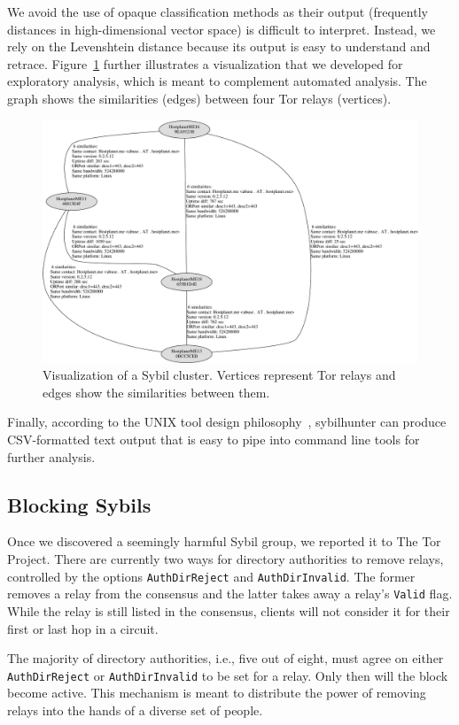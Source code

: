 We avoid the use of opaque classification methods as their output (frequently
distances in high-dimensional vector space) is difficult to interpret.  Instead,
we rely on the Levenshtein distance because its output is easy to understand and
retrace.  Figure~\ref{fig:visualization} further illustrates a visualization
that we developed for exploratory analysis, which is meant to complement
automated analysis.  The graph shows the similarities (edges) between four Tor
relays (vertices).

\begin{figure}[t]
	\centering
	\includegraphics[width=\linewidth]{diagrams/visualization.pdf}
    \caption{Visualization of a Sybil cluster.  Vertices represent Tor relays
    and edges show the similarities between them.}
	\label{fig:visualization}
\end{figure}

Finally, according to the UNIX tool design philosophy~\cite{Pike1983a},
sybilhunter can produce CSV-formatted text output that is easy to pipe into
command line tools for further analysis.

\subsection{Blocking Sybils}
\label{sec:blocking-sybils}
Once we discovered a seemingly harmful Sybil group, we reported it to The Tor
Project.  There are currently two ways for directory authorities to remove
relays, controlled by the options \texttt{AuthDirReject} and
\texttt{AuthDirInvalid}.  The former removes a relay from the consensus and the
latter takes away a relay's \texttt{Valid} flag.  While the relay is still
listed in the consensus, clients will not consider it for their first or last
hop in a circuit.

The majority of directory authorities, i.e., five out of eight, must agree on
either \texttt{AuthDirReject} or \texttt{AuthDirInvalid} to be set for a relay.
Only then will the block become active.  This mechanism is meant to distribute
the power of removing relays into the hands of a diverse set of people.
